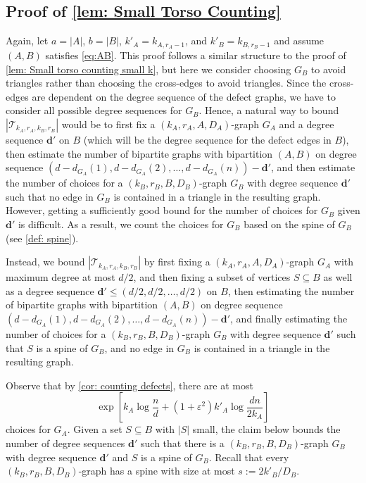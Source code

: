 \documentclass[11pt]{article}
\newcommand{\eps}{\varepsilon}
\theoremstyle{plain}
\begin{document}
\subsection{Proof of \cref{lem: Small Torso Counting}}\label{sec: small torso proof 1}
Again, let $a = |A|$, $b = |B|$, $k'_A = k_{A, r_A - 1}$, and $k'_B = k_{B, r_B - 1}$ and assume $(A,B)$ satisfies \eqref{eq:AB}. This proof follows a similar structure to the proof of \cref{lem: Small torso counting small k}, but here we consider choosing $G_B$ to avoid triangles rather than choosing the cross-edges to avoid triangles. Since the cross-edges are dependent on the degree sequence of the defect graphs, we have to consider all possible degree sequences for $G_B$. Hence, a natural way to bound $|\mathcal T_{k_A, r_A, k_B, r_B}|$ would be to first fix a $(k_A, r_A, A, D_A)$-graph $G_A$ and a degree sequence $\mathbf d'$ on $B$ (which will be the degree sequence for the defect edges in $B$), then estimate the number of bipartite graphs with bipartition $(A,B)$ on degree sequence $(d-d_{G_A}(1),d - d_{G_A}(2),\ldots, d - d_{G_A}(n)) - \mathbf d'$, and then estimate the number of choices for a $(k_B, r_B, B, D_B)$-graph $G_B$ with degree sequence ${\mathbf d}'$ such that no edge in $G_B$ is contained in a triangle in the resulting graph. However, getting a sufficiently good bound for the number of choices for $G_B$ given ${\mathbf d}'$ is difficult. As a result, we count the choices for $G_B$ based on the spine of $G_B$ (see \cref{def: spine}).

Instead, we bound $|\mathcal T_{k_A, r_A, k_B, r_B}|$ by first fixing a $(k_A, r_A, A, D_A)$-graph $G_A$ with maximum degree at most $d/2$, and then fixing a subset of vertices $S\subseteq B$ as well as a degree sequence $\mathbf d' \leq (d/2, d/2, \ldots, d/2)$ on $B$, then estimating the number of bipartite graphs with bipartition $(A,B)$ on degree sequence $(d-d_{G_A}(1),d - d_{G_A}(2),\ldots, d - d_{G_A}(n)) - \mathbf d'$, and finally estimating the number of choices for a $(k_B, r_B, B, D_B)$-graph $G_B$ with degree sequence ${\mathbf d}'$ such that $S$ is a spine of $G_B$, and no edge in $G_B$ is contained in a triangle in the resulting graph.


Observe that by \cref{cor: counting defects}, there are at most 
\begin{equation}\label{eq: GA}
    \exp\left[k_A\log\frac{n}{d} + (1 + \eps^2)k'_A\log\frac{dn}{2k_A}\right]
\end{equation}
choices for $G_A$. 
Given a set $S \subseteq B$ with $|S|$ small, the claim below bounds the number of degree sequences ${\mathbf d}'$ such that there is a $(k_B, r_B, B, D_B)$-graph $G_B$ with degree sequence $\mathbf{d}'$ and $S$ is a spine of $G_B$. Recall that every $(k_B, r_B, B, D_B)$-graph has a spine with size at most $s := 2k'_B/D_B$.
\end{document}
